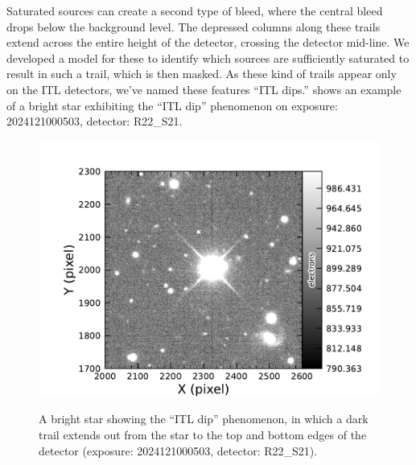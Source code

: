 Saturated sources can create a second type of bleed, where the central bleed drops below the background level.
The depressed columns along these trails extend across the entire height of the detector, crossing the detector mid-line.
We developed a model for these to identify which sources are sufficiently saturated to result in such a trail, which is then masked.  As these kind of trails appear only on the ITL detectors, we've named these features ``ITL dips.''
 shows an example of a   bright star exhibiting the ``ITL dip'' phenomenon on exposure: 2024121000503, detector: R22\_S21.

\begin{figure}[htb!]
  \centering
  \includegraphics[width=0.98\linewidth]{figures/dp1_isr_anomalies-itl_dip.pdf}
  \label{fig:anomalies_itl_dip}
  \caption{
    A bright star showing the ``ITL dip'' phenomenon, in which a dark trail extends out from the star to the top and bottom edges of the detector (exposure: 2024121000503, detector: R22\_S21).
  }
\end{figure}

